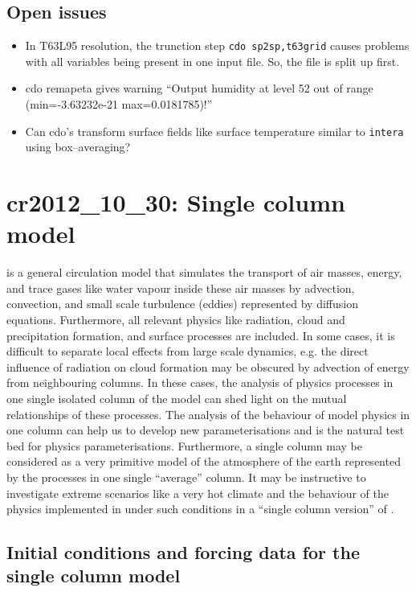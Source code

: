 \begin{appendix}
\subsection{Open issues}

\begin{itemize}
 \item In T63L95 resolution, the trunction step {\tt cdo
     sp2sp,t63grid} causes problems with all variables being present
   in one input file. So, the file is split up first.
 \item cdo remapeta gives warning ``Output humidity at level 52 out of
   range (min=-3.63232e-21 max=0.0181785)!'' 
 \item Can cdo's transform surface fields like surface temperature
   similar to {\tt intera} using box--averaging? 
\end{itemize}

\clearpage\newpage
\section{cr2012\_10\_30: Single column model}\label{cr20121030}

\echam{} is a general circulation model that simulates the
transport of air masses, energy, and trace gases like water vapour
inside these air 
masses by advection, convection, and small scale turbulence 
(eddies) represented by diffusion equations. Furthermore, all
relevant physics like radiation, cloud and precipitation formation, and
surface processes are included. In some cases, it is difficult to
separate local effects from large scale dynamics, e.g. the direct influence
of radiation on cloud formation may be obscured by advection of energy
from neighbouring columns.
In these cases, the analysis of physics processes in one
single isolated column of the model can shed light on the mutual
relationships of these processes. The analysis of the behaviour of
model physics in one column can help us to develop new
parameterisations and is the natural test bed for physics
parameterisations. Furthermore, a single column may be
considered as a very primitive model of the atmosphere of the earth
represented by the processes in one single ``average'' column. It may be
instructive to investigate extreme scenarios like a very hot climate
and the behaviour of the physics implemented in \echam{} under such
conditions in a ``single column version'' of \echam. 

\subsection{Initial conditions and forcing data for the single column
  model}\label{secforcing.appendix} 


\end{appendix}
